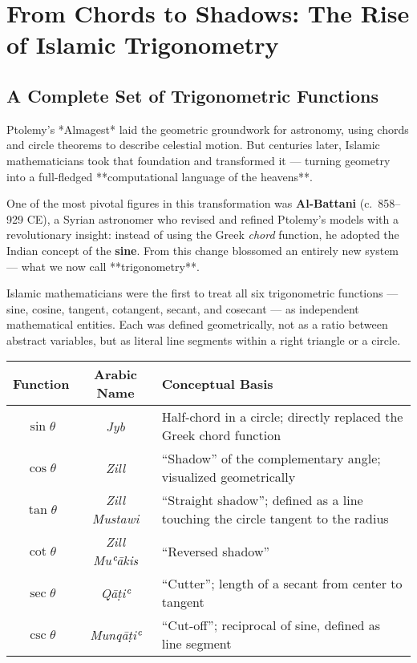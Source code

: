 \section{From Chords to Shadows: The Rise of Islamic Trigonometry}

\subsection{A Complete Set of Trigonometric Functions}

Ptolemy’s *Almagest* laid the geometric groundwork for astronomy, using chords and circle theorems to describe celestial motion. But centuries later, Islamic mathematicians took that foundation and transformed it — turning geometry into a full-fledged **computational language of the heavens**.

One of the most pivotal figures in this transformation was \textbf{Al-Battani} (c.~858–929 CE), a Syrian astronomer who revised and refined Ptolemy’s models with a revolutionary insight: instead of using the Greek \textit{chord} function, he adopted the Indian concept of the \textbf{sine}. From this change blossomed an entirely new system — what we now call **trigonometry**.

Islamic mathematicians were the first to treat all six trigonometric functions — sine, cosine, tangent, cotangent, secant, and cosecant — as independent mathematical entities. Each was defined geometrically, not as a ratio between abstract variables, but as literal line segments within a right triangle or a circle.

\begin{center}
\renewcommand{\arraystretch}{1.4}
\begin{tabular}{|c|c|p{6cm}|}
\hline
\textbf{Function} & \textbf{Arabic Name} & \textbf{Conceptual Basis} \\
\hline
\( \sin \theta \) & \textit{Jyb}  & Half-chord in a circle; directly replaced the Greek chord function \\
\( \cos \theta \) & \textit{Zill}  & “Shadow” of the complementary angle; visualized geometrically \\
\( \tan \theta \) & \textit{Zill Mustawi}  & “Straight shadow”; defined as a line touching the circle tangent to the radius \\
\( \cot \theta \) & \textit{Zill Muʿākis}  & “Reversed shadow” \\
\( \sec \theta \) & \textit{Qāṭiʿ}  & “Cutter”; length of a secant from center to tangent \\
\( \csc \theta \) & \textit{Munqāṭiʿ} & “Cut-off”; reciprocal of sine, defined as line segment \\
\hline
\end{tabular}
\end{center}

